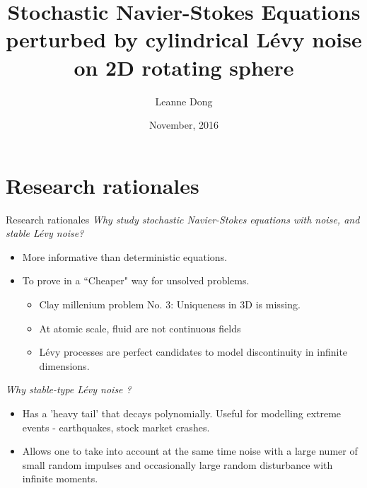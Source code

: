 \documentclass[xcolor=dvipsnames,leqno]{beamer}
\title{Stochastic Navier-Stokes Equations perturbed by cylindrical L\'evy noise on 2D rotating sphere}
\author[Leanne Dong]{Leanne Dong\\
\vspace{1cm}{\small Supervised by: Prof. Ben Goldys}}
\institute[Usyd]{School of Mathematics and Statistics\\
The University of Sydney}
\date{November, 2016}
\begin{document}
	\begin{frame}
	  \titlepage
	\end{frame}

\section[]{Research rationales}  
\begin{frame}{Research rationales}
	\emph{Why study stochastic Navier-Stokes equations {\color{red}with noise, and {\color{red}stable} L\'evy noise}?}
	\begin{itemize}         
		\item More informative than deterministic equations.
		\item To prove in a ``Cheaper" way for unsolved problems.\\
		\begin{itemize}
			\item Clay millenium problem No. 3: Uniqueness in 3D is missing.
			\item At atomic scale, fluid are not continuous fields
			\item L\'evy processes are perfect candidates to model discontinuity in infinite dimensions.
		\end{itemize}
	\end{itemize}
	\emph{Why stable-type L\'evy noise ?}
	\begin{itemize}
		\item Has a 'heavy tail' that decays polynomially. Useful for modelling extreme events - earthquakes, stock market crashes.
		\item Allows one to take into account at the same time noise with a large numer of small random impulses and occasionally large random disturbance with infinite moments.
	\end{itemize} 
\end{frame}
\end{document}
